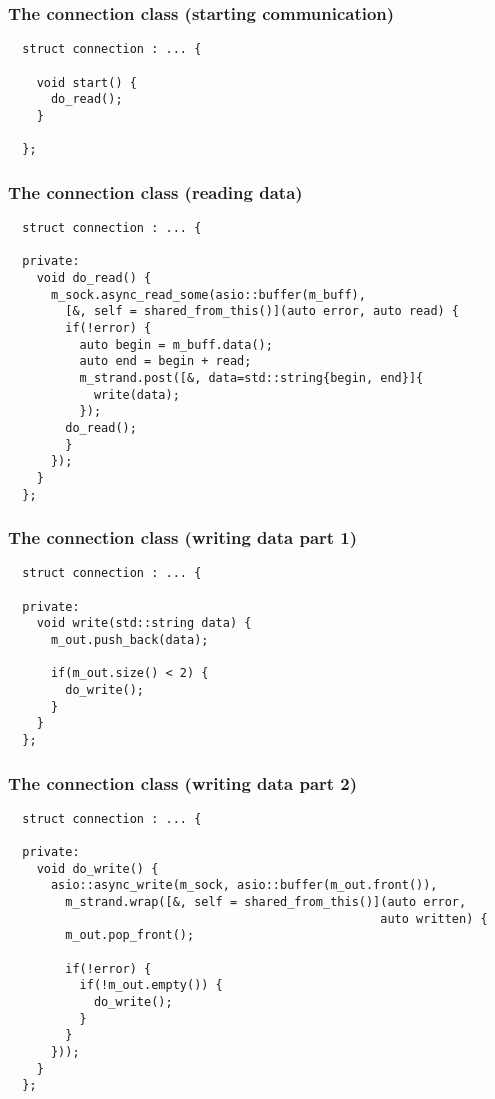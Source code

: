 \begin{frame}[fragile]
  \frametitle{The connection class (starting communication)}
  \begin{verbatim}
  struct connection : ... {

    void start() {
      do_read();
    }

  };
  \end{verbatim}
\end{frame}

\begin{frame}[fragile]
  \frametitle{The connection class (reading data)}
  \begin{verbatim}
  struct connection : ... {

  private:
    void do_read() {
      m_sock.async_read_some(asio::buffer(m_buff),
        [&, self = shared_from_this()](auto error, auto read) {
        if(!error) {
          auto begin = m_buff.data();
          auto end = begin + read;
          m_strand.post([&, data=std::string{begin, end}]{
            write(data);
          });
        do_read();
        }
      });
    }
  };
  \end{verbatim}
\end{frame}

\begin{frame}[fragile]
  \frametitle{The connection class (writing data part 1)}
  \begin{verbatim}
  struct connection : ... {

  private:
    void write(std::string data) {
      m_out.push_back(data);

      if(m_out.size() < 2) {
        do_write();
      }
    }
  };
  \end{verbatim}
\end{frame}

\begin{frame}[fragile]
  \frametitle{The connection class (writing data part 2)}
  \begin{verbatim}
  struct connection : ... {

  private:
    void do_write() {
      asio::async_write(m_sock, asio::buffer(m_out.front()),
        m_strand.wrap([&, self = shared_from_this()](auto error,
                                                    auto written) {
        m_out.pop_front();

        if(!error) {
          if(!m_out.empty()) {
            do_write();
          }
        }
      }));
    }
  };
  \end{verbatim}
\end{frame}

